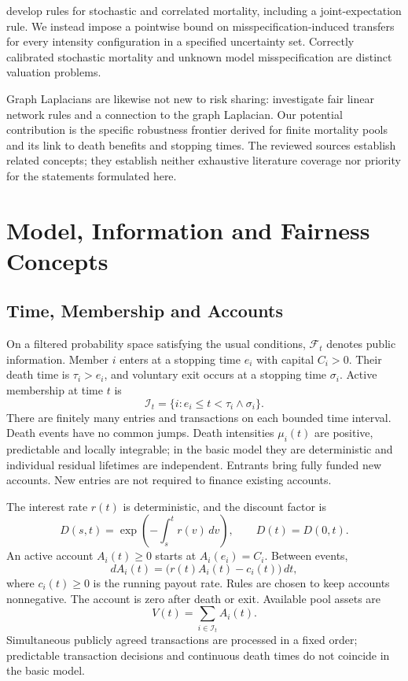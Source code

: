 \documentclass[11pt,a4paper]{article}
\theoremstyle{definition}\newtheorem{definition}[theorem]{Definition}
\theoremstyle{remark}\newtheorem{remark}[theorem]{Remark}
\newcommand{\calF}{\mathcal F}
\newcommand{\calI}{\mathcal I}
\begin{document}
\citet{zhou2025} develop rules for stochastic and correlated mortality, including a joint-expectation rule. We instead impose a pointwise bound on misspecification-induced transfers for every intensity configuration in a specified uncertainty set. Correctly calibrated stochastic mortality and unknown model misspecification are distinct valuation problems.

Graph Laplacians are likewise not new to risk sharing: \citet{fogarty2026} investigate fair linear network rules and a connection to the graph Laplacian. Our potential contribution is the specific robustness frontier derived for finite mortality pools and its link to death benefits and stopping times. The reviewed sources establish related concepts; they establish neither exhaustive literature coverage nor priority for the statements formulated here.

\section{Model, Information and Fairness Concepts}\label{sec:model}
\subsection{Time, Membership and Accounts}
On a filtered probability space satisfying the usual conditions, $\calF_t$ denotes public information. Member $i$ enters at a stopping time $e_i$ with capital $C_i>0$. Their death time is $\tau_i>e_i$, and voluntary exit occurs at a stopping time $\sigma_i$. Active membership at time $t$ is
\[
\calI_t=\{i:e_i\le t<\tau_i\wedge\sigma_i\}.
\]
There are finitely many entries and transactions on each bounded time interval. Death events have no common jumps. Death intensities $\mu_i(t)$ are positive, predictable and locally integrable; in the basic model they are deterministic and individual residual lifetimes are independent. Entrants bring fully funded new accounts. New entries are not required to finance existing accounts.

The interest rate $r(t)$ is deterministic, and the discount factor is
\[
D(s,t)=\exp\left(-\int_s^t r(v)\,dv\right),\qquad D(t)=D(0,t).
\]
An active account $A_i(t)\ge0$ starts at $A_i(e_i)=C_i$. Between events,
\begin{equation}\label{eq:accountflow}
dA_i(t)=\bigl(r(t)A_i(t)-c_i(t)\bigr)\,dt,
\end{equation}
where $c_i(t)\ge0$ is the running payout rate. Rules are chosen to keep accounts nonnegative. The account is zero after death or exit. Available pool assets are
\[
V(t)=\sum_{i\in\calI_t}A_i(t).
\]
Simultaneous publicly agreed transactions are processed in a fixed order; predictable transaction decisions and continuous death times do not coincide in the basic model.
\end{document}
